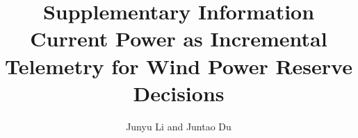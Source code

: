 \documentclass[11pt]{article}
\begin{document}
\title{Supplementary Information\\Current Power as Incremental Telemetry for Wind Power Reserve Decisions}
\author{Junyu Li and Juntao Du}
\date{}
\maketitle




\end{document}
